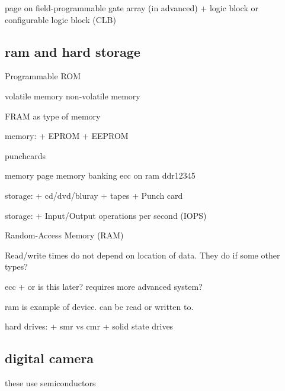 page on field-programmable gate array (in advanced)
+ logic block or configurable logic block (CLB)

\subsection{ram and hard storage}

Programmable ROM

volatile memory
non-volatile memory


FRAM as type of memory

memory:
+ EPROM
+ EEPROM

punchcards

memory page
memory banking
ecc on ram
ddr12345

storage:
+ cd/dvd/bluray
+ tapes
+ Punch card

storage:
+ Input/Output operations per second (IOPS)

Random-Access Memory (RAM)

Read/write times do not depend on location of data. They do if some other types?

ecc
+ or is this later? requires more advanced system?

ram is example of device. can be  read or written to.

hard drives:
+ smr vs cmr
+ solid state drives

\subsection{digital camera}

these use semiconductors


